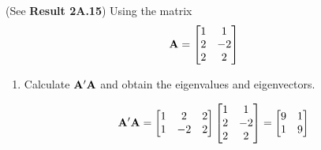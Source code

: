         (See \textbf{Result 2A.15}) Using the matrix
        \[
            \bold{A} = 
            \begin{bmatrix}
                1 & 1 \\
                2 & -2 \\
                2 & 2
            \end{bmatrix}
        \]
        \begin{enumerate}[label=(\alph*)]
            \item Calculate $\bold{A}^\prime\bold{A}$ and obtain the eigenvalues and eigenvectors.
            \par
            \[
                \bold{A}^\prime\bold{A}
                =
                \begin{bmatrix}
                    1 & 2 & 2 \\
                    1 & -2 & 2
                \end{bmatrix}
                \begin{bmatrix}
                    1 & 1 \\
                    2 & -2 \\
                    2 & 2
                \end{bmatrix}
                =
                \begin{bmatrix}
                    9 & 1 \\
                    1 & 9
                \end{bmatrix}
            \]
            

\end{enumerate}
